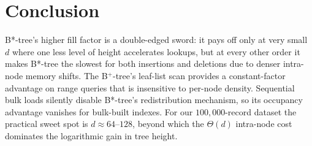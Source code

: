 \documentclass[sigconf]{acmart}
\begin{document}
\section{Conclusion}
B*-tree's higher fill factor is a double-edged sword: it pays off only at very small $d$ where one less level of height accelerates lookups, but at every other order it makes B*-tree the slowest for both insertions and deletions due to denser intra-node memory shifts. The B$^+$-tree's leaf-list scan provides a constant-factor advantage on range queries that is insensitive to per-node density. Sequential bulk loads silently disable B*-tree's redistribution mechanism, so its occupancy advantage vanishes for bulk-built indexes. For our $100{,}000$-record dataset the practical sweet spot is $d \approx 64$--$128$, beyond which the $\Theta(d)$ intra-node cost dominates the logarithmic gain in tree height.



\end{document}
